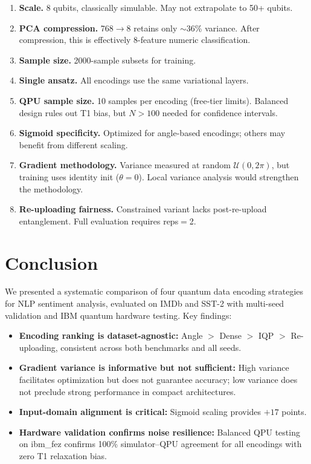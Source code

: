 \documentclass[conference,onecolumn,11pt]{IEEEtran}
\begin{document}
\begin{enumerate}
\item \textbf{Scale.} 8 qubits, classically simulable. May not extrapolate to 50+ qubits.
\item \textbf{PCA compression.} 768$\rightarrow$8 retains only $\sim$36\% variance. After compression, this is effectively 8-feature numeric classification.
\item \textbf{Sample size.} 2000-sample subsets for training.
\item \textbf{Single ansatz.} All encodings use the same variational layers.
\item \textbf{QPU sample size.} 10 samples per encoding (free-tier limits). Balanced design rules out T1 bias, but $N>100$ needed for confidence intervals.
\item \textbf{Sigmoid specificity.} Optimized for angle-based encodings; others may benefit from different scaling.
\item \textbf{Gradient methodology.} Variance measured at random $\mathcal{U}(0, 2\pi)$, but training uses identity init ($\theta=0$). Local variance analysis would strengthen the methodology.
\item \textbf{Re-uploading fairness.} Constrained variant lacks post-re-upload entanglement. Full evaluation requires reps$=$2.
\end{enumerate}

\section{Conclusion}

We presented a systematic comparison of four quantum data encoding strategies for NLP sentiment analysis, evaluated on IMDb and SST-2 with multi-seed validation and IBM quantum hardware testing. Key findings:

\begin{itemize}
\item \textbf{Encoding ranking is dataset-agnostic:} Angle $>$ Dense $>$ IQP $>$ Re-uploading, consistent across both benchmarks and all seeds.
\item \textbf{Gradient variance is informative but not sufficient:} High variance facilitates optimization but does not guarantee accuracy; low variance does not preclude strong performance in compact architectures.
\item \textbf{Input-domain alignment is critical:} Sigmoid scaling provides $+17$ points.
\item \textbf{Hardware validation confirms noise resilience:} Balanced QPU testing on ibm\_fez confirms 100\% simulator--QPU agreement for all encodings with zero T1 relaxation bias.
\end{itemize}
\end{document}
